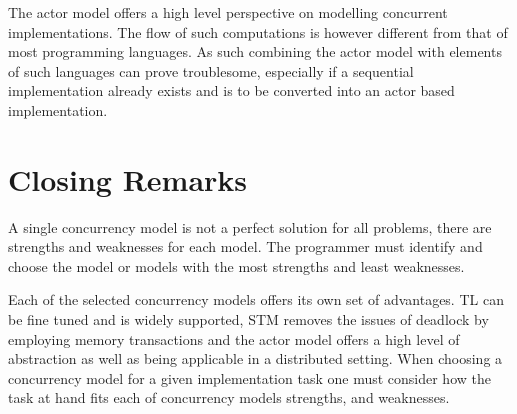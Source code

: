 The actor model offers a high level perspective on modelling concurrent implementations. The flow of such computations is however different from that of most programming languages. As such combining the actor model with elements of such languages can prove troublesome, especially if a sequential implementation already exists and is to be converted into an actor based implementation.






\section{Closing Remarks}\label{sec:choose_closing}
A single concurrency model is not a perfect solution for all problems, there are strengths and weaknesses for each model. The programmer must identify and choose the model or models with the most strengths and least weaknesses. 

Each of the selected concurrency models offers its own set of advantages. \ac{TL} can be fine tuned and is widely supported, \ac{STM} removes the issues of deadlock by employing memory transactions and the actor model offers a high level of abstraction as well as being applicable in a distributed setting. When choosing a concurrency model for a given implementation task one must consider how the task at hand fits each of concurrency models strengths, and weaknesses.

